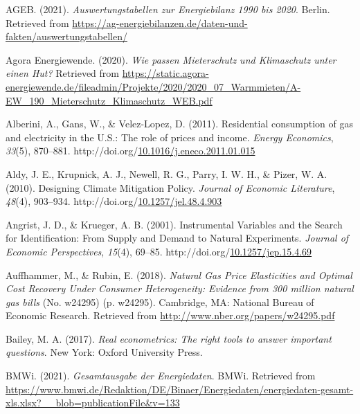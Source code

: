 \documentclass[12pt,twoside]{reedthesis}
\newlength{\cslhangindent}
\newenvironment{CSLReferences}[2] %
 {%
  \setlength{\parindent}{0pt}
  \ifodd #1 \everypar{\setlength{\hangindent}{\cslhangindent}}\ignorespaces\fi
  \ifnum #2 > 0
  \setlength{\parskip}{#2\baselineskip}
  \fi
 }%
 {}
\begin{document}
\hypertarget{refs}{}
\begin{CSLReferences}{1}{0}
\leavevmode{}%
AGEB. (2021). \emph{Auswertungstabellen zur Energiebilanz 1990 bis 2020}. Berlin. Retrieved from \url{https://ag-energiebilanzen.de/daten-und-fakten/auswertungstabellen/}

\leavevmode{}%
Agora Energiewende. (2020). \emph{Wie passen Mieterschutz und Klimaschutz unter einen Hut?} Retrieved from \url{https://static.agora-energiewende.de/fileadmin/Projekte/2020/2020_07_Warmmieten/A-EW_190_Mieterschutz_Klimaschutz_WEB.pdf}

\leavevmode{}%
Alberini, A., Gans, W., \& Velez-Lopez, D. (2011). Residential consumption of gas and electricity in the U.S.: The role of prices and income. \emph{Energy Economics}, \emph{33}(5), 870--881. http://doi.org/\href{https://doi.org/10.1016/j.eneco.2011.01.015}{10.1016/j.eneco.2011.01.015}

\leavevmode{}%
Aldy, J. E., Krupnick, A. J., Newell, R. G., Parry, I. W. H., \& Pizer, W. A. (2010). Designing Climate Mitigation Policy. \emph{Journal of Economic Literature}, \emph{48}(4), 903--934. http://doi.org/\href{https://doi.org/10.1257/jel.48.4.903}{10.1257/jel.48.4.903}

\leavevmode{}%
Angrist, J. D., \& Krueger, A. B. (2001). Instrumental Variables and the Search for Identification: From Supply and Demand to Natural Experiments. \emph{Journal of Economic Perspectives}, \emph{15}(4), 69--85. http://doi.org/\href{https://doi.org/10.1257/jep.15.4.69}{10.1257/jep.15.4.69}

\leavevmode{}%
Auffhammer, M., \& Rubin, E. (2018). \emph{Natural Gas Price Elasticities and Optimal Cost Recovery Under Consumer Heterogeneity: Evidence from 300 million natural gas bills} (No. w24295) (p. w24295). Cambridge, MA: National Bureau of Economic Research. Retrieved from \url{http://www.nber.org/papers/w24295.pdf}

\leavevmode{}%
Bailey, M. A. (2017). \emph{Real econometrics: The right tools to answer important questions}. New York: Oxford University Press.

\leavevmode{}%
BMWi. (2021). \emph{Gesamtausgabe der Energiedaten}. BMWi. Retrieved from \url{https://www.bmwi.de/Redaktion/DE/Binaer/Energiedaten/energiedaten-gesamt-xls.xlsx?__blob=publicationFile\&v=133}


\end{CSLReferences}
\end{document}

